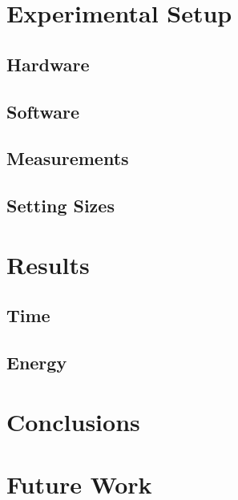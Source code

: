 \documentclass[sigconf,preprint,9pt]{acmart}
\begin{document}
\section{Experimental Setup}\label{sec:experimental_setup}
\subsection{Hardware}
\subsection{Software}
\subsection{Measurements}
\subsection{Setting Sizes}


\section{Results}\label{sec:results}
\subsection{Time}
\subsection{Energy}


\section{Conclusions}


\section{Future Work}





\newpage
\listoftodos[Notes]
\end{document}
